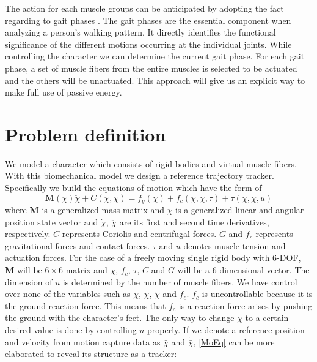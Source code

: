 \documentclass[master,english,final]{kaist-ucs}
\begin{document}
The action for each muscle groups can be anticipated by adopting the
fact regarding to gait phases \cite{perry}. The gait phases are the essential component
when analyzing a person's walking pattern. It directly identifies the
functional significance of the different motions occurring at the
individual joints. While controlling the character we
can determine the current gait phase. For each gait phase,
a set of muscle fibers from the entire muscles is selected to be actuated
and the others will be unactuated. This approach will give us an explicit
way to make full use of passive energy.



\chapter{Problem definition}

We model a character which consists of rigid bodies and virtual muscle fibers.
With this biomechanical model we design a reference trajectory tracker.
Specifically we build the equations of motion which have the
form of
\begin{equation}\label{MoEq}
\mathbf{M}(\chi)\ddot\chi + C(\chi,\dot\chi ) = f_g(\chi) + f_c(\chi, \dot\chi, \tau ) + \tau (\chi, \dot\chi, u)
\end{equation}
where $\mathbf{M}$ is a generalized mass matrix and $\chi$ is a generalized
linear and angular position
state vector and $\dot\chi$, $\ddot\chi$ are its first and second time derivatives,
respectively. $C$ represents Coriolis and centrifugal forces.
$G$ and $f_c$ represents gravitational forces and contact forces.
$\tau$ and $u$ denotes muscle tension and actuation forces.
For the case of a freely moving single
rigid body with 6-DOF, $\mathbf{M}$ will be $6\times 6$ matrix and $\chi$,
$f_c$, $\tau$, $C$ and $G$ will be a 6-dimensional vector. The dimension of $u$ is
determined by the number of muscle fibers. We have control
over none of the variables such as $\chi$, $\dot\chi$, $\ddot\chi$ and $f_c$.
$f_c$ is uncontrollable because it is the ground reaction force. This means that
$f_c$ is a reaction force arises by pushing the ground with the character's feet.
The only way to change $\chi$ to a certain desired value is done by controlling $u$
properly. If we denote a reference position and velocity from motion capture data
as $\bar\chi$ and $\dot{\bar\chi}$, \eqref{MoEq} can be more elaborated
to reveal its structure as a tracker:
\end{document}
